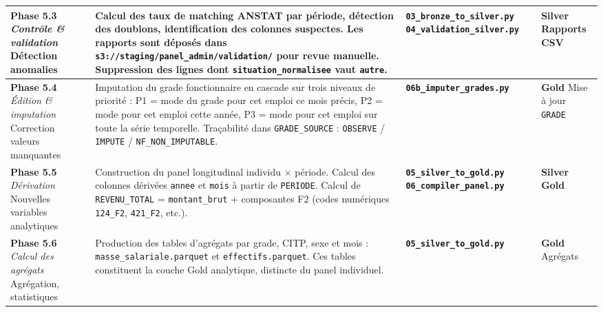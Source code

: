 \documentclass[12pt,a4paper,french]{report}
\newcommand{\scriptname}[1]{\texttt{\textbf{#1}}}
\newcommand{\bucket}[1]{\texttt{s3://#1}}
\newcommand{\colname}[1]{\texttt{#1}}
\begin{document}
\begin{longtable}{p{3.2cm} p{5.5cm} p{4cm} p{2cm}}
  \midrule

  \textbf{Phase 5.3}
  \newline \textit{Contrôle \& validation}
  \newline \small{Détection anomalies}
  &
  Calcul des taux de matching ANSTAT par période, détection des doublons,
  identification des colonnes suspectes. Les rapports sont déposés dans
  \bucket{staging/panel\_admin/validation/} pour revue manuelle.
  Suppression des lignes dont \colname{situation\_normalisee} vaut \texttt{autre}.
  &
  \scriptname{03\_bronze\_to\_silver.py}
  \newline \scriptname{04\_validation\_silver.py}
  &
  \textbf{Silver}
  \newline Rapports CSV \\

  \midrule

  \textbf{Phase 5.4}
  \newline \textit{Édition \& imputation}
  \newline \small{Correction valeurs manquantes}
  &
  Imputation du grade fonctionnaire en cascade sur trois niveaux de priorité :
  P1 = mode du grade pour cet emploi ce mois précis,
  P2 = mode pour cet emploi cette année,
  P3 = mode pour cet emploi sur toute la série temporelle.
  Traçabilité dans \colname{GRADE\_SOURCE} : \texttt{OBSERVE} / \texttt{IMPUTE} /
  \texttt{NF\_NON\_IMPUTABLE}.
  &
  \scriptname{06b\_imputer\_grades.py}
  &
  \textbf{Gold}
  \newline Mise à jour \texttt{GRADE} \\

  \midrule

  \textbf{Phase 5.5}
  \newline \textit{Dérivation}
  \newline \small{Nouvelles variables analytiques}
  &
  Construction du panel longitudinal individu $\times$ période. Calcul des colonnes
  dérivées \colname{annee} et \colname{mois} à partir de \colname{PERIODE}.
  Calcul de \colname{REVENU\_TOTAL} = \colname{montant\_brut} + composantes F2
  (codes numériques \texttt{124\_F2}, \texttt{421\_F2}, etc.).
  &
  \scriptname{05\_silver\_to\_gold.py}
  \newline \scriptname{06\_compiler\_panel.py}
  &
  \textbf{Silver}
  \newline \textbf{Gold} \\

  \midrule

  \textbf{Phase 5.6}
  \newline \textit{Calcul des agrégats}
  \newline \small{Agrégation, statistiques}
  &
  Production des tables d'agrégats par grade, CITP, sexe et mois :
  \texttt{masse\_salariale.parquet} et \texttt{effectifs.parquet}.
  Ces tables constituent la couche Gold analytique, distincte du panel individuel.
  &
  \scriptname{05\_silver\_to\_gold.py}
  &
  \textbf{Gold}
  \newline Agrégats \\


\end{longtable}
\end{document}
